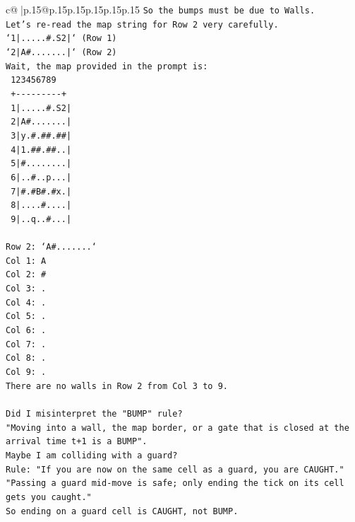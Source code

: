 \documentclass{article}
\begin{document}
{\begin{supertabular}{c@{$\;$}|p{.15\linewidth}@{}p{.15\linewidth}p{.15\linewidth}p{.15\linewidth}p{.15\linewidth}p{.15\linewidth}}
{{{\texttt{So the bumps must be due to Walls.} \\
\texttt{Let's re{-}read the map string for Row 2 very carefully.} \\
\texttt{`1|.....\#.S2|` (Row 1)} \\
\texttt{`2|A\#.......|` (Row 2)} \\
\texttt{Wait, the map provided in the prompt is:} \\
\texttt{   123456789} \\
\texttt{  +{-}{-}{-}{-}{-}{-}{-}{-}{-}+} \\
\texttt{ 1|.....\#.S2|} \\
\texttt{ 2|A\#.......|} \\
\texttt{ 3|y.\#.\#\#.\#\#|} \\
\texttt{ 4|1.\#\#.\#\#..|} \\
\texttt{ 5|\#........|} \\
\texttt{ 6|..\#..p...|} \\
\texttt{ 7|\#.\#B\#.\#x.|} \\
\texttt{ 8|....\#....|} \\
\texttt{ 9|..q..\#...|} \\
\\ 
\texttt{Row 2: `A\#.......`} \\
\texttt{Col 1: A} \\
\texttt{Col 2: \#} \\
\texttt{Col 3: .} \\
\texttt{Col 4: .} \\
\texttt{Col 5: .} \\
\texttt{Col 6: .} \\
\texttt{Col 7: .} \\
\texttt{Col 8: .} \\
\texttt{Col 9: .} \\
\texttt{There are no walls in Row 2 from Col 3 to 9.} \\
\\ 
\texttt{Did I misinterpret the "BUMP" rule?} \\
\texttt{"Moving into a wall, the map border, or a gate that is closed at the arrival time t+1 is a BUMP".} \\
\texttt{Maybe I am colliding with a guard?} \\
\texttt{Rule: "If you are now on the same cell as a guard, you are CAUGHT."} \\
\texttt{"Passing a guard mid{-}move is safe; only ending the tick on its cell gets you caught."} \\
\texttt{So ending on a guard cell is CAUGHT, not BUMP.} \\
}}}
\end{supertabular}}
\end{document}
